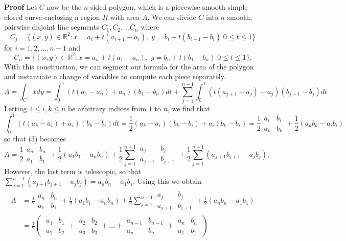 \documentclass[11pt, letterpaper]{article}
\newcommand{\mbb}[1]{\mathbb{#1}}
\begin{document}
    {\bf Proof} Let $C$ now be the $n$-sided polygon, which is a piecewise smooth simple closed curve enclosing a region $R$ with area $A$. We
    can divide $C$ into $n$ smooth, pairwise disjoint line segments $C_1,C_2,\dots C_n$ where
    \[C_j=\{(x,y)\in\mbb{R}^2:x=a_i+t(a_{i+1}-a_i),\;y=b_i+t(b_{i+1}-b_i)\;0\leq t\leq 1\}\]
    for $i=1,2,\dots,n-1$ and 
    \[C_n=\{(x,y)\in\mbb{R}^2:x=a_n+t(a_1-a_n),\;y=b_n+t(b_1-b_n)\;0\leq t\leq 1\}.\]
    With this construction, we can segment our formula for the area of the polygon and instantiate a change of variables to compute each piece separately.
    \[A=\int_Cxdy=\int_{0}^1(t(a_1-a_n)+a_n)(b_1-b_n)dt+\sum_{j=1}^{n-1}\int_0^1(t(a_{j+1}-a_j)+a_j)(b_{j+1}-b_j)dt\tag{3}\]
    Letting $1\leq i,k\leq n$ be arbitrary indices from $1$ to $n$, we find that
    \[\int_0^1(t(a_k-a_i)+a_i)(b_k-b_i)dt=\frac{1}{2}(a_k-a_i)(b_k-b_i)+a_i(b_k-b_i)=\frac{1}{2}\begin{array}{|cc|}
        a_i & b_i\\
        a_k & b_k
    \end{array}+\frac{1}{2}(a_kb_k-a_ib_i)\]
    so that (3) becomes
    \[A=\frac{1}{2}\begin{array}{|cc|}
        a_n & b_n\\
        a_1 & b_1
    \end{array}+\frac{1}{2}(a_1b_1-a_nb_n)+\frac{1}{2}\sum_{j=1}^{n-1}\begin{array}{|cc|}
        a_j & b_j\\
        a_{j+1} & b_{j+1}
    \end{array}+\frac{1}{2}\sum_{j=1}^{n-1}(a_{j+1}b_{j+1}-a_jb_j).\]
    However, the last term is telescopic, so that $\sum_{j=1}^{n-1}(a_{j+1}b_{j+1}-a_jb_j)=a_nb_n-a_1b_1$. Using this we obtain
    \begin{align*}
        A&=\frac{1}{2}\begin{array}{|cc|}
            a_n & b_n\\
            a_1 & b_1
        \end{array}+\frac{1}{2}(a_1b_1-a_nb_n)+\frac{1}{2}\sum_{j=1}^{n-1}\begin{array}{|cc|}
            a_j & b_j\\
            a_{j+1} & b_{j+1}
        \end{array}+\frac{1}{2}(a_{n}b_{n}-a_1b_1)\\
        &=\frac{1}{2}\left(\;\begin{array}{|cc|}
        a_1 & b_1\\
        a_2 & b_2
    \end{array}+\begin{array}{|cc|}
        a_2 & b_2\\
        a_3 & b_3
    \end{array}+\dots +\begin{array}{|cc|}
        a_{n-1} & b_{n-1}\\
        a_n & b_n
    \end{array}+\begin{array}{|cc|}
        a_n & b_n\\
        a_1 & b_1
    \end{array}\;
    \right)
    \end{align*}
\end{document}

